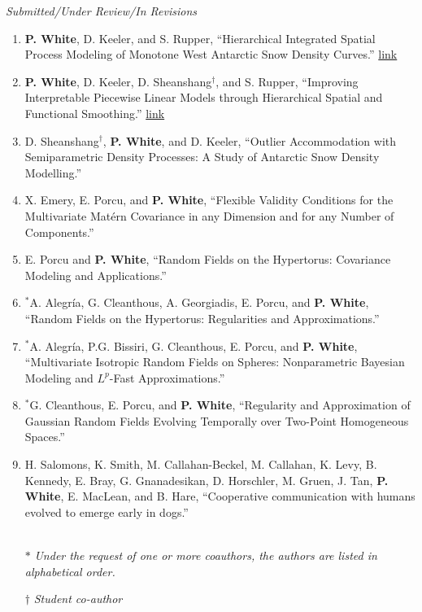 \documentclass[12pt]{article}
\begin{document}
\emph{Submitted/Under Review/In Revisions}

\begin{enumerate}[label=$\bullet$]
\item \textbf{P. White}, D. Keeler, and S. Rupper, ``Hierarchical Integrated Spatial Process Modeling of Monotone West Antarctic Snow Density Curves.'' \href{https://arxiv.org/abs/2001.05520}{link}
\item \textbf{P. White}, D. Keeler, D. Sheanshang$^\dagger$, and S. Rupper, ``Improving Interpretable Piecewise Linear Models through Hierarchical Spatial and Functional Smoothing.'' \href{https://arxiv.org/abs/2006.09329}{link}
\item D. Sheanshang$^\dagger$, \textbf{P. White}, and D. Keeler, ``Outlier Accommodation with Semiparametric Density Processes: A Study of Antarctic Snow Density Modelling.''
\item X. Emery, E. Porcu, and \textbf{P. White}, ``Flexible Validity Conditions for the Multivariate Mat\'ern Covariance in any Dimension and for any Number of Components.''
\item  E. Porcu and \textbf{P. White}, ``Random Fields on the Hypertorus: Covariance Modeling and Applications.'' 
\item $^*$A. Alegr\'ia, G. Cleanthous, A. Georgiadis, E. Porcu, and \textbf{P. White}, ``Random Fields on the Hypertorus: Regularities and Approximations.'' 
\item $^*$A. Alegr\'ia, P.G. Bissiri, G. Cleanthous, E. Porcu, and \textbf{P. White}, ``Multivariate Isotropic Random  Fields on Spheres: Nonparametric Bayesian Modeling and $L^p$-Fast Approximations.''
\item $^*$G. Cleanthous, E. Porcu, and \textbf{P. White}, ``Regularity and Approximation of Gaussian Random Fields Evolving Temporally over Two-Point Homogeneous Spaces.'' 
\item H. Salomons, K. Smith, M. Callahan-Beckel, M. Callahan, K. Levy, B. Kennedy, E. Bray, G. Gnanadesikan, D. Horschler, M. Gruen, J. Tan, \textbf{P. White}, E. MacLean, and B. Hare, ``Cooperative communication with humans evolved to emerge early in dogs.'' \\
\setlength\itemsep{-1em} \\
\item[$*$] \textit{Under the request of one or more coauthors, the authors are listed in alphabetical order.}\\
\item[$\dagger$] \textit{Student co-author}
\end{enumerate}
\end{document}
